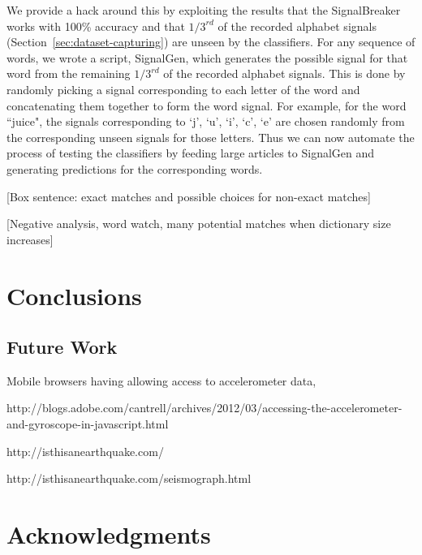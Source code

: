 \documentclass[11pt,conference]{IEEEtran}
\begin{document}
We provide a hack around this by exploiting the results that
the SignalBreaker works with 100\% accuracy and that $1/3^{rd}$ of the recorded
alphabet signals (Section~\ref{sec:dataset-capturing}) are unseen by the classifiers.
For any sequence of words, we wrote a script, SignalGen, which generates the possible
signal for that word from the remaining $1/3^{rd}$ of the recorded alphabet signals.
This is done by randomly picking a signal corresponding to each letter of the word
and concatenating them together to form the word signal. For example, for the word
``juice", the signals corresponding to `j', `u', `i', `c', `e' are chosen randomly
from the corresponding unseen signals for those letters. Thus we can now automate
the process of testing the classifiers by feeding large articles to SignalGen
and generating predictions for the corresponding words.


 


[Box sentence: exact matches and possible choices for non-exact matches]

[Negative analysis, word watch, many potential matches  when dictionary size increases]


\section{Conclusions}

\subsection{Future Work}

Mobile browsers having allowing access to accelerometer data,

http://blogs.adobe.com/cantrell/archives/2012/03/accessing-the-accelerometer-and-gyroscope-in-javascript.html

http://isthisanearthquake.com/

http://isthisanearthquake.com/seismograph.html

\section{Acknowledgments}
\end{document}
